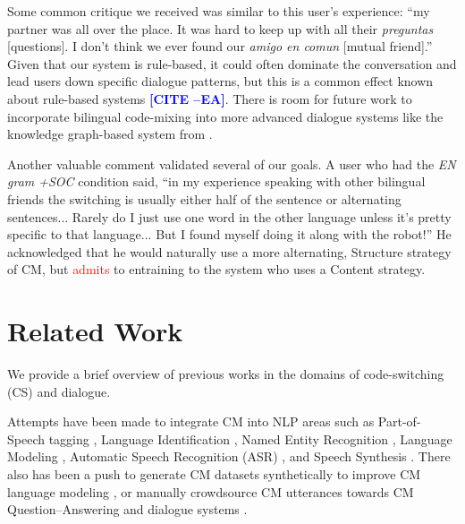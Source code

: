 \documentclass[11pt,a4paper]{article}
\newcommand{\ea}[1]{\textcolor{blue}{\bf\small [#1 --EA]}}
\newcommand{\red}[1]{\textcolor{red}{#1}}
\begin{document}
Some common critique we received was similar to this user's experience: ``my partner was all over the place. It was hard to keep up with all their \textit{preguntas} [questions]. I don't think we ever found our \textit{amigo en comun} [mutual friend].''
Given that our system is rule-based, it could often dominate the conversation and lead users down specific dialogue patterns, but this is a common effect known about rule-based systems \ea{CITE}.
There is room for future work to incorporate bilingual code-mixing into more advanced dialogue systems like the knowledge graph-based system from \citet{He2017}.

Another valuable comment validated several of our goals.
A user who had the \textit{EN gram +SOC} condition said, ``in my experience speaking with other bilingual friends the switching is usually either half of the sentence or alternating sentences... Rarely do I just use one word in the other language unless it's pretty specific to that language... But I found myself doing it along with the robot!''
He acknowledged that he would naturally use a more alternating, Structure strategy of CM, but \red{admits} to entraining to the system who uses a Content strategy.



\section{Related Work}
\label{sec:related-work}

We provide a brief overview of previous works in the domains of code-switching (CS) and dialogue.


Attempts have been made to integrate CM into NLP areas such as Part-of-Speech tagging \citep{Solorio2008,soto2018joint}, Language Identification \citep{soto2018joint,Rijhwani2017}, Named Entity Recognition \citep{aguilar2018named}, Language Modeling \citep{chandu2018language}, Automatic Speech Recognition (ASR) \citep{yilmaz2018building}, and Speech Synthesis \citep{Rallabandi2017}.
There also has been a push to generate CM datasets synthetically to improve CM language modeling \citep{pratapa2018language}, or manually crowdsource CM utterances towards CM Question--Answering and dialogue systems \citep{chandu2018code,banerjee2018dataset}.
\end{document}

